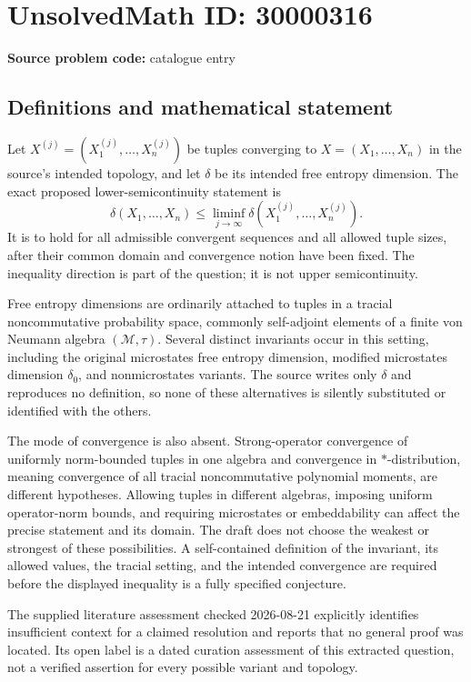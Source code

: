 \documentclass[11pt]{article}
\begin{document}
\section*{UnsolvedMath ID: 30000316}
\textbf{Source problem code:} catalogue entry
\subsection{Definitions and mathematical statement}
Let \(X^{(j)}=(X_1^{(j)},\ldots,X_n^{(j)})\) be tuples converging to \(X=(X_1,\ldots,X_n)\) in the source's intended topology, and let \(\delta\) be its intended free entropy dimension. The exact proposed lower-semicontinuity statement is
\[
\delta(X_1,\ldots,X_n)\leq
\liminf_{j\to\infty}\delta(X_1^{(j)},\ldots,X_n^{(j)}).
\]
It is to hold for all admissible convergent sequences and all allowed tuple sizes, after their common domain and convergence notion have been fixed. The inequality direction is part of the question; it is not upper semicontinuity.

Free entropy dimensions are ordinarily attached to tuples in a tracial noncommutative probability space, commonly self-adjoint elements of a finite von Neumann algebra \((\mathcal M,\tau)\). Several distinct invariants occur in this setting, including the original microstates free entropy dimension, modified microstates dimension \(\delta_0\), and nonmicrostates variants. The source writes only \(\delta\) and reproduces no definition, so none of these alternatives is silently substituted or identified with the others.

The mode of convergence is also absent. Strong-operator convergence of uniformly norm-bounded tuples in one algebra and convergence in \(*\)-distribution, meaning convergence of all tracial noncommutative polynomial moments, are different hypotheses. Allowing tuples in different algebras, imposing uniform operator-norm bounds, and requiring microstates or embeddability can affect the precise statement and its domain. The draft does not choose the weakest or strongest of these possibilities. A self-contained definition of the invariant, its allowed values, the tracial setting, and the intended convergence are required before the displayed inequality is a fully specified conjecture.

The supplied literature assessment checked 2026-08-21 explicitly identifies insufficient context for a claimed resolution and reports that no general proof was located. Its open label is a dated curation assessment of this extracted question, not a verified assertion for every possible variant and topology.
\end{document}
